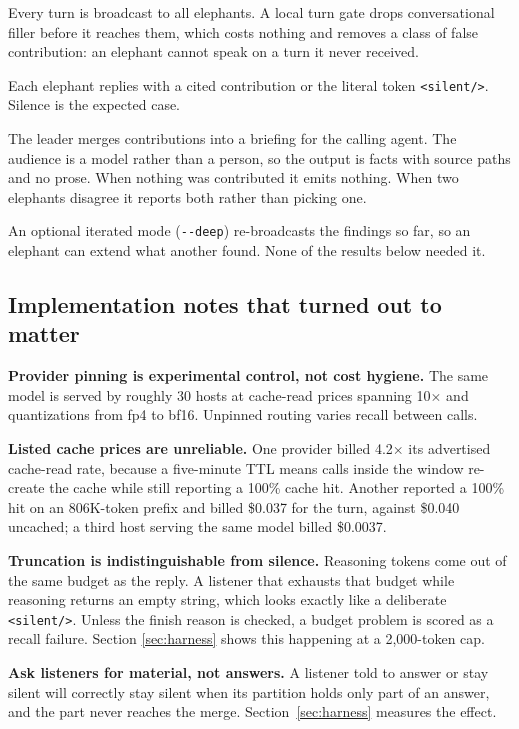 \documentclass[11pt]{article}
\begin{document}
Every turn is broadcast to all elephants. A local turn gate drops conversational filler
before it reaches them, which costs nothing and removes a class of false contribution:
an elephant cannot speak on a turn it never received.

Each elephant replies with a cited contribution or the literal token
\texttt{<silent/>}. Silence is the expected case.

The leader merges contributions into a briefing for the calling agent. The audience is
a model rather than a person, so the output is facts with source paths and no prose.
When nothing was contributed it emits nothing. When two elephants disagree it reports
both rather than picking one.

An optional iterated mode (\texttt{-{}-deep}) re-broadcasts the findings so far, so an
elephant can extend what another found. None of the results below needed it.

\subsection{Implementation notes that turned out to matter}

\textbf{Provider pinning is experimental control, not cost hygiene.} The same model is
served by roughly 30 hosts at cache-read prices spanning 10$\times$ and quantizations
from fp4 to bf16. Unpinned routing varies recall between calls.

\textbf{Listed cache prices are unreliable.} One provider billed 4.2$\times$ its
advertised cache-read rate, because a five-minute TTL means calls inside the window
re-create the cache while still reporting a 100\% cache hit. Another reported a 100\%
hit on an 806K-token prefix and billed \$0.037 for the turn, against \$0.040 uncached;
a third host serving the same model billed \$0.0037.

\textbf{Truncation is indistinguishable from silence.} Reasoning tokens come out of the
same budget as the reply. A listener that exhausts that budget while reasoning returns
an empty string, which looks exactly like a deliberate \texttt{<silent/>}. Unless the
finish reason is checked, a budget problem is scored as a recall failure. Section
\ref{sec:harness} shows this happening at a 2{,}000-token cap.

\textbf{Ask listeners for material, not answers.} A listener told to answer or stay
silent will correctly stay silent when its partition holds only part of an answer, and
the part never reaches the merge. Section~\ref{sec:harness} measures the effect.
\end{document}
